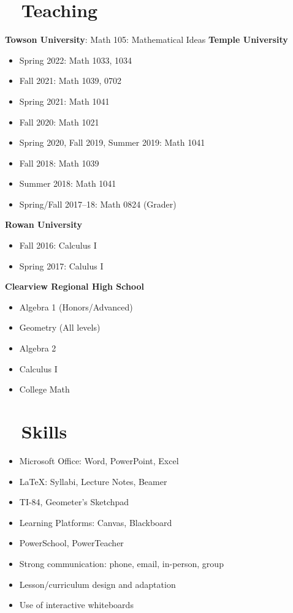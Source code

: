 \documentclass[10pt]{article}
\begin{document}
\section*{\faBookOpen ~ Teaching}
\textbf{Towson University}: Math 105: Mathematical Ideas
\textbf{Temple University}
\begin{itemize}
    \item Spring 2022: Math 1033, 1034
    \item Fall 2021: Math 1039, 0702
    \item Spring 2021: Math 1041
    \item Fall 2020: Math 1021
    \item Spring 2020, Fall 2019, Summer 2019: Math 1041
    \item Fall 2018: Math 1039
    \item Summer 2018: Math 1041
    \item Spring/Fall 2017--18: Math 0824 (Grader)
\end{itemize}

\textbf{Rowan University}
\begin{itemize}
    \item Fall 2016: Calculus I
    \item Spring 2017: Calulus I
\end{itemize}

\textbf{Clearview Regional High School}
\begin{itemize}
    \item Algebra 1 (Honors/Advanced)
    \item Geometry (All levels)
    \item Algebra 2
    \item Calculus I
    \item College Math
\end{itemize}

\section*{\faTools ~ Skills}
\begin{itemize}
    \item Microsoft Office: Word, PowerPoint, Excel
    \item LaTeX: Syllabi, Lecture Notes, Beamer
    \item TI-84, Geometer's Sketchpad
    \item Learning Platforms: Canvas, Blackboard
    \item PowerSchool, PowerTeacher
    \item Strong communication: phone, email, in-person, group
    \item Lesson/curriculum design and adaptation
    \item Use of interactive whiteboards
\end{itemize}
\end{document}
